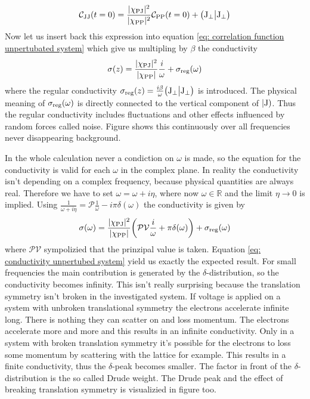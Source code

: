 %
\begin{align}
	\mathcal{C}_{\mathrm{JJ}}(t=0) = \frac{\vert\chi_{\mathrm{PJ}}\vert^{2}}{\vert\chi_{\mathrm{PP}}\vert^{2}} \mathcal{C}_{\mathrm{PP}}(t=0) + \big({\mathrm{J}_{\bot}}\big|{\mathrm{J}_{\bot}}\big)
\end{align}
%
Now let us insert back this expression into equation \eqref{eq: correlation function unpertubated system} which give us multipling by $\beta$ the conductivity
%
\begin{align}
	\sigma (z) = \frac{\vert\chi_{\mathrm{PJ}}\vert^{2}}{\vert\chi_{\mathrm{PP}}\vert} \frac{i}{\omega}  + \sigma_{\mathrm{reg}}(\omega)
\end{align}
%
where the regular conductivity $\sigma_{\mathrm{reg}}(z) = \frac{i \beta}{\omega} \big({\mathrm{J}_{\bot}}\big|{\mathrm{J}_{\bot}}\big)$ is introduced.
The physical meaning of $\sigma_{\mathrm{reg}}(\omega)$ is directly connected to the vertical component of $|\mathrm{\mathrm{J}})$.
Thus the regular conductivity includes fluctuations and other effects influenced by random forces called noise.
Figure  shows this continuously over all frequencies never disappearing background.

In the whole calculation never a condiction on $\omega$ is made, so the equation for the conductivity is valid for each $\omega$ in the complex plane.
In reality the conductivity isn't depending on a complex frequency, because physical quantities are always real.
Therefore we have to set $\omega = \omega + i \eta$, where now $\omega \in \mathbb{R}$ and the limit $\eta \to 0$ is implied.
Using $\frac{1}{\omega + i\eta} = \mathcal{P}\frac{1}{\omega} - i\pi\delta(\omega)$ the conductivity is given by
%
\begin{align}
	\sigma(\omega) = \frac{\vert\chi_{\mathrm{PJ}}\vert^{2}}{\vert\chi_{\mathrm{PP}}\vert} \bigg( \mathcal{PV} \frac{i}{\omega} + \pi \delta(\omega) \bigg) + \sigma_{\mathrm{reg}}(\omega)
	\label{eq: conductivity unpertubed system}
\end{align}
%
where $\mathcal{PV}$ sympolizied that the prinzipal value is taken.
Equation \eqref{eq: conductivity unpertubed system} yield us exactly the expected result.
For small frequencies the main contribution is generated by the $\delta$-distribution, so the conductivity becomes infinity.
This isn't really surprising because the translation symmetry isn't broken in the investigated system.
If voltage is applied on a system with unbroken translational symmetry the electrons accelerate infinite long.
There is nothing they can scatter on and loss momentum.
The electrons accelerate more and more and this results in an infinite conductivity.
Only in a system with broken translation symmetry it's possible for the electrons to loss some momentum by scattering with the lattice for example.
This results in a finite conductivity, thus the $\delta$-peak becomes smaller.
The factor in front of the $\delta$-distribution is the so called Drude weight.
The Drude peak and the effect of breaking translation symmetry is visualizied in figure  too.
%
%
